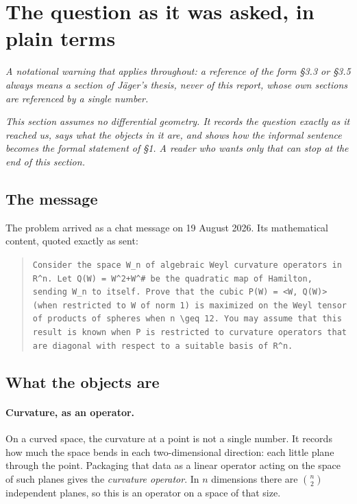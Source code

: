 \section{The question as it was asked, in plain terms}\label{sec:plain}

\emph{A notational warning that applies throughout: a reference of the form \S3.3 or \S3.5 always means a section of J\"ager's thesis, never of this report, whose own sections are referenced by a single number.}

\emph{This section assumes no differential geometry. It records the question exactly as it reached us, says what the objects in it are, and shows how the informal sentence becomes the formal statement of \S1. A reader who wants only that can stop at the end of this section.}

\subsection{The message}

The problem arrived as a chat message on 19 August 2026. Its mathematical content, quoted exactly as sent:

\begin{quote}
\small
\texttt{Consider the space W\_n of algebraic Weyl curvature operators in R\textasciicircum n. Let Q(W) = W\textasciicircum 2+W\textasciicircum\# be the quadratic map of Hamilton, sending W\_n to itself. Prove that the cubic P(W) = \textless W, Q(W)\textgreater{} (when restricted to W of norm 1) is maximized on the Weyl tensor of products of spheres when n \textbackslash geq 12. You may assume that this result is known when P is restricted to curvature operators that are diagonal with respect to a suitable basis of R\textasciicircum n.}
\end{quote}

\subsection{What the objects are}

\paragraph{Curvature, as an operator.} On a curved space, the curvature at a point is not a single number. It records how much the space bends in each two-dimensional direction: each little plane through the point. Packaging that data as a linear operator acting on the space of such planes gives the \emph{curvature operator}. In $n$ dimensions there are $\binom n2$ independent planes, so this is an operator on a space of that size.

